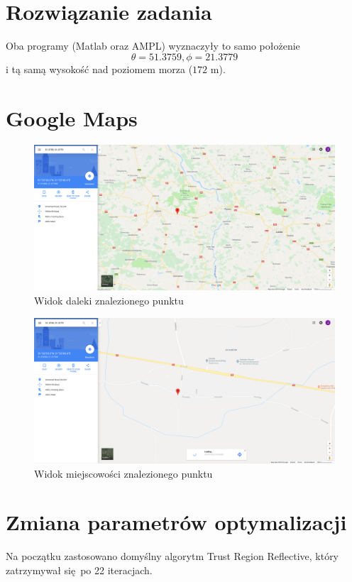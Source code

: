 \documentclass[]{article}
\begin{document}
\section{Rozwiązanie zadania}
Oba programy (Matlab oraz AMPL) wyznaczyły to samo położenie
\[ \theta = 51.3759 , \phi = 21.3779 \] i tą samą wysokość nad poziomem morza ($172$ m).

\section{Google Maps}
\begin{figure}[H]
	\centering
	\includegraphics[width=0.99\linewidth]{daleko}
	\caption{Widok daleki znalezionego punktu}
	\label{fig:daleko}
\end{figure}

\begin{figure}[H]
	\centering
	\includegraphics[width=0.99\linewidth]{blisko}
	\caption{Widok miejscowości znalezionego punktu}
	\label{fig:blisko}
\end{figure}

\section{Zmiana parametrów optymalizacji}
Na początku zastosowano domyślny algorytm Trust Region Reflective, który zatrzymywał się po 22 iteracjach.
\end{document}
